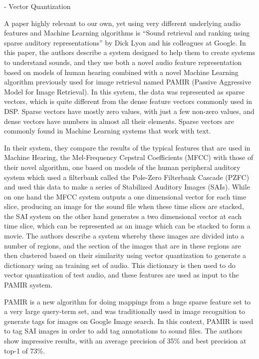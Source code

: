 \documentclass[12pt,oneside]{book}
\begin{document}
- Vector Quantization

A paper highly relevant to our own, yet using very different
underlying audio features and Machine Learning algorithms is ``Sound
retrieval and ranking using sparse auditory representations''
\cite{lyon10} by Dick Lyon and his colleagues at Google.  In this
paper, the authors describe a system designed to help them to create
systems to understand sounds, and they use both a novel audio feature
representation based on models of human hearing combined with a novel
Machine Learning algorithm previously used for image retrieval named
PAMIR (Passive Aggressive Model for Image Retrieval).  In this system,
the data was represented as sparse vectors, which is quite different
from the dense feature vectors commonly used in DSP.  Sparse vectors
have mostly zero values, with just a few non-zero values, and dense
vectors have numbers in almost all their elements.  Sparse vectors are
commonly found in Machine Learning systems that work with text.

In their system, they compare the results of the typical features that
are used in Machine Hearing, the Mel-Frequency Cepstral Coefficients
\cite{Logan00melfrequency} (MFCC) with those of their novel algorithm,
one based on models of the human peripheral auditory system which used
a filterbank called the Pole-Zero Filterbank Cascade (PZFC) and used
this data to make a series of Stabilized Auditory Images (SAIs).
While on one hand the MFCC system outputs a one dimensional vector for
each time slice, producing an image for the sound file when these time
slices are stacked, the SAI system on the other hand generates a two
dimensional vector at each time slice, which can be represented as an
image which can be stacked to form a movie.  The authors describe a
system whereby these images are divided into a number of regions, and
the section of the images that are in these regions are then clustered
based on their similarity using vector quantization to generate a
dictionary using an training set of audio.  This dictionary is then
used to do vector quantization of test audio, and these features are
used as input to the PAMIR system.

PAMIR is a new algorithm for doing mappings from a huge sparse feature
set to a very large query-term set, and was traditionally used in
image recognition \cite{chechik10} to generate tags for images on
Google Image search.  In this context, PAMIR is used to tag SAI images
in order to add tag annotations to sound files.  The authors show
impressive results, with an average precision of 35\% and best
precision at top-1 of 73\%.
\end{document}
